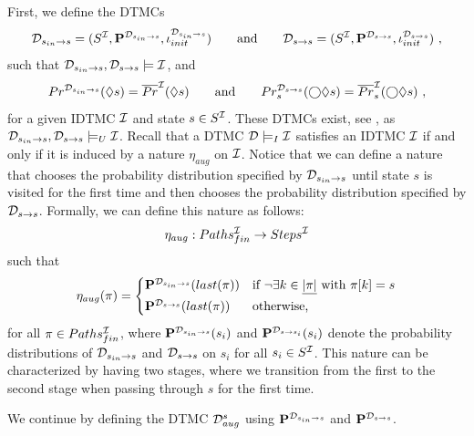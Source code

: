 First, we define the DTMCs 
\[\mathcal{D}_{s_{in}\rightarrow s} = (S^{\mathcal{I}},\mathbf{P}^{\mathcal{D}_{s_{in}\rightarrow s}},\iota_{init}^{\mathcal{D}_{s_{in}\rightarrow s}}) \qquad \text{and} \qquad \mathcal{D}_{s\rightarrow s} = (S^{\mathcal{I}},\mathbf{P}^{\mathcal{D}_{s\rightarrow s}},\iota_{init}^{\mathcal{D}_{s\rightarrow s}})\ ,\] 
such that $\mathcal{D}_{s_{in}\rightarrow s},\mathcal{D}_{s\rightarrow s}\models \mathcal{I}$, and 
\begin{equation}\label{eq:optimalility_of_reach_for_DTMCs_for_aug}
    Pr^{\mathcal{D}_{s_{in}\rightarrow s}}(\lozenge s) = \overline{Pr}^{\mathcal{I}}(\lozenge s) \qquad \text{and} \qquad Pr^{\mathcal{D}_{s\rightarrow s}}_s(\bigcirc\lozenge s) = \overline{Pr}^{\mathcal{I}}_s(\bigcirc\lozenge s)\ ,
\end{equation}
for a given IDTMC $\mathcal{I}$ and state $s\in S^{\mathcal{I}}$.
These DTMCs exist, see , as $\mathcal{D}_{s_{in}\rightarrow s},\mathcal{D}_{s\rightarrow s}\models_U \mathcal{I}$.
Recall that a DTMC $\mathcal{D} \models_I \mathcal{I}$ satisfies an IDTMC $\mathcal{I}$ if and only if it is induced by a nature $\eta_{aug}$ on $\mathcal{I}$. Notice that we can define a nature that chooses the probability distribution specified by $\mathcal{D}_{s_{in}\rightarrow s}$ until state $s$ is visited for the first time and then chooses the probability distribution specified by $\mathcal{D}_{s\rightarrow s}$. Formally, we can define this nature as follows:
\[ \eta_{aug}: Paths_{fin}^{\mathcal{I}} \rightarrow Steps^{\mathcal{I}}\]
such that 
\[\eta_{aug}(\pi) = \begin{cases*}
    \PF^{\MC_{s_{in}\rightarrow s}}(last(\pi)) & if $\neg\exists k \in \underline{|\pi|}$ with $\pi[k] = s$\\
    \PF^{\MC_{s\rightarrow s}}(last(\pi)) & otherwise,
\end{cases*}\]
for all $\pi \in Paths^{\mathcal{I}}_{fin}$, where $\mathbf{P}^{\mathcal{D}_{s_{in}\rightarrow s}}(s_i)$ and $\mathbf{P}^{\mathcal{D}_{s\rightarrow s_i}}(s_i)$ denote the probability distributions of ${\mathcal{D}_{s_{in}\rightarrow s}}$ and ${\mathcal{D}_{s\rightarrow s}}$ on $s_i$ for all $s_i \in S^{\mathcal{I}}$.
This nature can be characterized by having two stages, where we transition from the first to the second stage when passing through $s$ for the first time.

We continue by defining the DTMC $\mathcal{D}^s_{aug}$ using $\mathbf{P}^{\mathcal{D}_{s_{in}\rightarrow s}}$ and $\mathbf{P}^{\mathcal{D}_{s\rightarrow s}}$.

